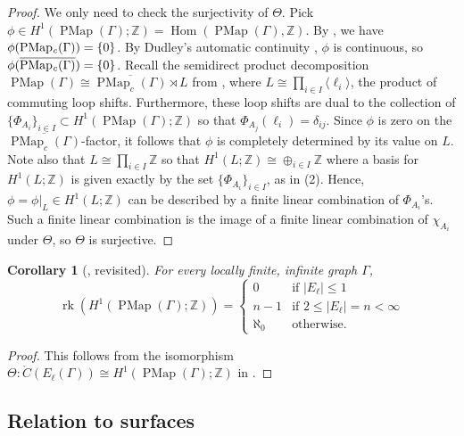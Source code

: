 \documentclass[11pt]{amsart}
\theoremstyle{plain}
\newtheorem{COR}[THM]{Corollary}
\theoremstyle{definition}
\DeclareMathOperator{\Hom}{Hom}
\DeclareMathOperator{\PMap}{PMap}
\DeclareMathOperator{\PMapc}{PMap_{\it c}}
\DeclareMathOperator{\rk}{rk}
\newcommand{\Z}{\mathbb{Z}}
\def\G{{\Gamma}}
\newcommand{\la}{\langle}
\newcommand{\ra}{\rangle}
\newcommand{\<}{\langle}
\renewcommand{\>}{\rangle}
\newcommand{\dC}{\mathring{C}}
\begin{document}
\begin{proof}
  We only need to check the surjectivity of $\Theta$. Pick $\phi \in H^1(\PMap(\G);\Z) = \Hom(\PMap(\G),\Z)$.  
  By , we have $\phi(\PMapc(\G)) = \{0\}$. By Dudley's 
  automatic continuity \cite{dudley1961}, $\phi$ is continuous, so
  $\phi(\overline{\PMapc(\G)})=\{0\}$.
  Recall the semidirect product decomposition $\PMap(\G) \cong
  \overline{\PMap_c(\G)} \rtimes L$ from
  ,
  where $L \cong \prod_{i \in I} \la \ell_{i} \ra$, the product of commuting loop shifts. Furthermore, these loop shifts are dual to the collection of $\{\Phi_{A_{i}}\}_{i\in I} \subset H^{1}(\PMap(\G);\Z)$ so that $\Phi_{A_j}(\ell_i) = \delta_{ij}$.
  Since $\phi$ is zero on the $\overline{\PMap_c(\G)}$-factor, it follows
  that $\phi$ is completely determined by its value on $L$. Note also that $L \cong \prod_{i \in I}\Z$ so that $H^{1}(L;\Z) \cong \oplus_{i \in I}\Z$ where a basis for $H^{1}(L;\Z)$ is given exactly by the set $\{\Phi_{A_{i}}\}_{i\in I}$, as in (2). Hence,
  $\phi = \phi|_{L} \in H^1(L; \Z)$ can be described
  by a finite linear combination of $\Phi_{A_i}$'s. Such a finite linear combination is the image of a finite linear combination of $\chi_{A_i}$ under $\Theta$, so
  $\Theta$ is surjective.
\end{proof}

\begin{COR}[, revisited]\label{cor:rankoffirstcohomology_revisited}
For every locally finite, infinite graph $\G$,
    \[
    \rk \left(H^1(\PMap(\G);\Z)\right) =
        \begin{cases}
            0 & \text{if $|E_\ell| \le 1$} \\
            n-1 & \text{if $2 \le |E_\ell|=n< \infty$} \\
            \aleph_0 & \text{otherwise}.
        \end{cases}
    \]
\end{COR}

\begin{proof}
    This follows from the isomorphism $\Theta: \dC(E_\ell(\G)) \cong H^1(\PMap(\G);\Z)$ in .
\end{proof}

\subsection{Relation to surfaces} \label{ssec:surfacescohom}
\end{document}
